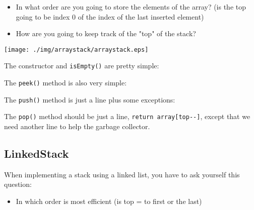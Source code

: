 \documentclass[a4paper, 9pt]{extarticle}
\begin{document}
\begin{itemize}

  \item In what order are you going to store the elements of the array? (is the top going to be index 0 of the index of the last inserted element)

  \item How are you going to keep track of the "top" of the stack?

\end{itemize}

\begin{center}
  \texttt{[image: ./img/arraystack/arraystack.eps]}
\end{center}


The constructor and \verb+isEmpty()+ are pretty simple:


The \verb+peek()+ method is also very simple:


The \verb+push()+ method is just a line plus some exceptions:


The \verb+pop()+ method should be just a line, \verb+return array[top--]+,
except that we need another line to help the garbage collector.










\subsection{LinkedStack}

When implementing a stack using a linked list, you have to ask yourself this question:

\begin{itemize}

  \item In which order is most efficient (is top = to first or the last)

\end{itemize}
\end{document}
